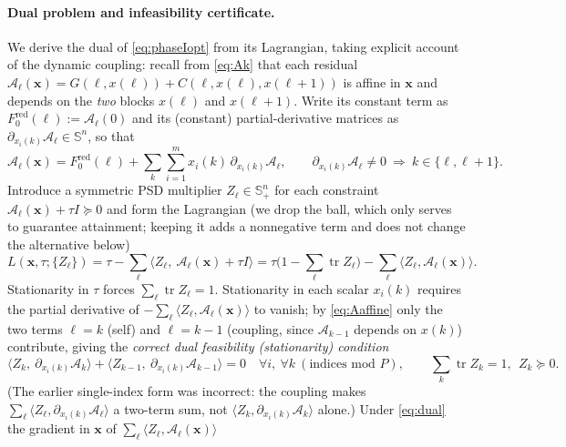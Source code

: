 \documentclass{amsart}
\newcommand{\Sym}{\mathbb{S}}
\newcommand{\tr}{\operatorname{tr}}
\begin{document}
\paragraph{Dual problem and infeasibility certificate.}
We derive the dual of \eqref{eq:phaseIopt} from its Lagrangian, taking explicit
account of the dynamic coupling: recall from \eqref{eq:Ak} that each residual
$\mathcal A_\ell(\bm x)=G(\ell,x(\ell))+C(\ell,x(\ell),x(\ell+1))$ is affine in
$\bm x$ and depends on the \emph{two} blocks $x(\ell)$ and $x(\ell+1)$. Write its
constant term as $F_0^{\mathrm{red}}(\ell):=\mathcal A_\ell(0)$ and its (constant)
partial-derivative matrices as $\partial_{x_i(k)}\mathcal A_\ell\in\Sym^n$, so that
\begin{equation}\label{eq:Aaffine}
  \mathcal A_\ell(\bm x)=F_0^{\mathrm{red}}(\ell)
     +\sum_{k}\sum_{i=1}^m x_i(k)\,\partial_{x_i(k)}\mathcal A_\ell,
  \qquad
  \partial_{x_i(k)}\mathcal A_\ell\neq0\ \Rightarrow\ k\in\{\ell,\ell+1\}.
\end{equation}
Introduce a symmetric PSD multiplier $Z_\ell\in\Sym^n_+$ for each constraint
$\mathcal A_\ell(\bm x)+\tau I\succeq0$ and form the Lagrangian (we drop the ball,
which only serves to guarantee attainment; keeping it adds a nonnegative term and does
not change the alternative below)
\[
  L(\bm x,\tau;\{Z_\ell\})
   =\tau-\sum_{\ell}\big\langle Z_\ell,\ \mathcal A_\ell(\bm x)+\tau I\big\rangle
   =\tau\Big(1-\sum_\ell\tr Z_\ell\Big)-\sum_\ell\big\langle Z_\ell,\mathcal A_\ell(\bm x)\big\rangle .
\]
Stationarity in $\tau$ forces $\sum_\ell\tr Z_\ell=1$. Stationarity in each scalar
$x_i(k)$ requires the partial derivative of $-\sum_\ell\langle Z_\ell,\mathcal
A_\ell(\bm x)\rangle$ to vanish; by \eqref{eq:Aaffine} only the two terms $\ell=k$
(self) and $\ell=k-1$ (coupling, since $\mathcal A_{k-1}$ depends on $x(k)$)
contribute, giving the \emph{correct dual feasibility (stationarity) condition}
\begin{equation}\label{eq:dual}
  \big\langle Z_k,\ \partial_{x_i(k)}\mathcal A_k\big\rangle
  +\big\langle Z_{k-1},\ \partial_{x_i(k)}\mathcal A_{k-1}\big\rangle=0
  \quad\forall i,\ \forall k\ (\text{indices mod }P),
  \qquad \sum_k\tr Z_k=1,\ \ Z_k\succeq0 .
\end{equation}
(The earlier single-index form was incorrect: the coupling makes
$\sum_\ell\langle Z_\ell,\partial_{x_i(k)}\mathcal A_\ell\rangle$ a two-term sum, not
$\langle Z_k,\partial_{x_i(k)}\mathcal A_k\rangle$ alone.) Under \eqref{eq:dual} the
gradient in $\bm x$ of $\sum_\ell\langle Z_\ell,\mathcal A_\ell(\bm x)\rangle$
\end{document}
